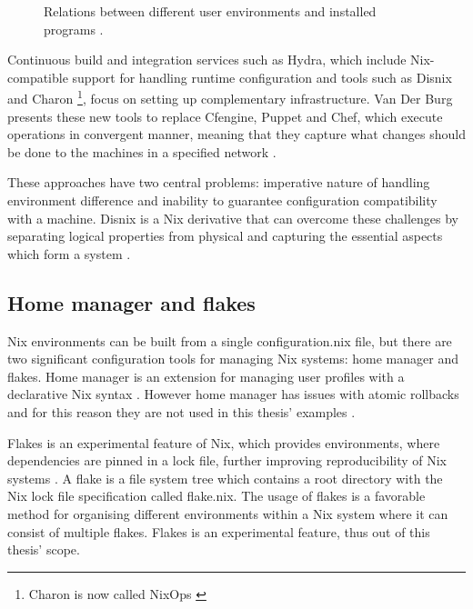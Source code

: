 \begin{figure}[t!]
\centerline{}
\caption[Relation graph in Nix environment.]{Relations between different user environments and installed
  programs \cite{nixosUserEnvironment}.}
\label{userenvs}
\end{figure}

Continuous build and integration services such as Hydra,
which include Nix-compatible support for handling runtime
configuration and tools such as Disnix and Charon \footnote{Charon is
now called NixOps \cite{githubNixNixpkgsNixOS}}, focus on
setting up complementary infrastructure. Van Der Burg presents these
new tools to replace Cfengine, Puppet and Chef, which execute
operations in convergent manner, meaning that they capture what
changes should be done to the machines in a specified
network \cite{van2013reference}.

These approaches have two central problems: imperative nature of
handling environment difference and inability to guarantee
configuration compatibility with a machine. Disnix is a Nix derivative
that can overcome these challenges by separating logical properties
from physical and capturing the essential aspects which form a
system \cite{van2013reference}.

\subsection{Home manager and flakes}

Nix environments can be built from a single configuration.nix file,
but there are two significant configuration tools for managing Nix
systems: home manager and flakes. Home manager is an extension for
managing user profiles with a declarative Nix syntax
\cite{nixcommunityHomeManager}. However home manager has issues with atomic
rollbacks and for this reason they are not used in this thesis'
examples \cite{nixcommunityHomeManager}.

Flakes is an experimental feature of Nix, which provides environments, where
dependencies are pinned in a lock file, further improving
reproducibility of Nix systems \cite{nixosFlakesNixOS}. A flake is a
file system tree which contains a root directory with the Nix lock file
specification called flake.nix. The usage of flakes is a favorable method
for organising different environments within a Nix system where it
can consist of multiple flakes. Flakes is an experimental
feature, thus out of this thesis' scope. 

